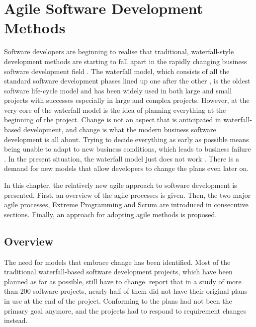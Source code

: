 \chapter{Agile Software Development Methods}
\label{toc:agile}

Software developers are beginning to realise that traditional, 
waterfall-style development methods are starting to fall apart in the 
rapidly changing business software development field 
\citep{betterway}. The waterfall model, which consists of all the 
standard software development phases lined up one after the other 
\citep{softwareeng}, is the oldest software life-cycle model and has 
been widely used in both large and small projects \citep{agilequality} 
with successes especially in large and complex projects. However, at 
the very core of the waterfall model is the idea of planning 
everything at the beginning of the project. Change is not an aspect 
that is anticipated in waterfall-based development, and change is what 
the modern business software development is all about. Trying to 
decide everything as early as possible means being unable to adapt to 
new business conditions, which leads to business failure 
\citep{agileinnovation}. In the present situation, the waterfall model 
just does not work \citep{betterway}. There is a demand for new models 
that allow developers to change the plans even later on.

In this chapter, the relatively new agile approach to software 
development is presented. First, an overview of the agile processes is 
given. Then, the two major agile processes, Extreme Programming and 
Scrum are introduced in consecutive sections. Finally, an approach for 
adopting agile methods is proposed.


\section{Overview}
\label{toc:agile:overview}

The need for models that embrace change has been identified. Most of 
the traditional waterfall-based software development projects, which 
have been planned as far as possible, still have to change. 
\cite{agileinnovation} report that in a study of more than 200 
software projects, nearly half of them did not have their original 
plans in use at the end of the project. Conforming to the plans had 
not been the primary goal anymore, and the projects had to respond to 
requirement changes instead.

